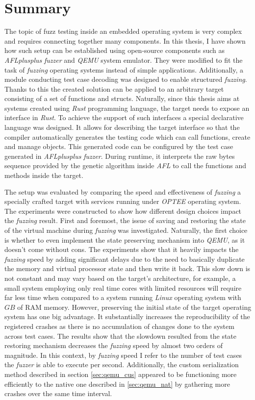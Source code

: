\cleardoublepage
\section{Summary} \label{chap:summ}
The topic of fuzz testing inside an embedded operating system is very complex and requires connecting together many components. In this thesis, I have shown how such setup can be established using open-source components such as \textit{AFLplusplus} \textit{fuzzer} and \textit{QEMU} system emulator. They were modified to fit the task of \textit{fuzzing} operating systems instead of simple applications. Additionally, a module conducting test case decoding was designed to enable structured \textit{fuzzing}. Thanks to this the created solution can be applied to an arbitrary target consisting of a set of functions and structs. Naturally, since this thesis aims at systems created using \textit{Rust} programming language, the target needs to expose an interface in \textit{Rust}. To achieve the support of such interfaces a special declarative language was designed. It allows for describing the target interface so that the compiler automatically generates the testing code which can call functions, create and manage objects. This generated code can be configured by the test case generated in \textit{AFLplusplus} \textit{fuzzer}. During runtime, it interprets the raw bytes sequence provided by the genetic algorithm inside \textit{AFL} to call the functions and methods inside the target.

The setup was evaluated by comparing the speed and effectiveness of \textit{fuzzing} a specially crafted target with services running under \textit{OPTEE} operating system. The experiments were constructed to show how different design choices impact the \textit{fuzzing} result. First and foremost, the issue of saving and restoring the state of the virtual machine during \textit{fuzzing} was investigated. Naturally, the first choice is whether to even implement the state preserving mechanism into \textit{QEMU}, as it doesn't come without cons. The experiments show that it heavily impacts the \textit{fuzzing} speed by adding significant delays due to the need to basically duplicate the memory and virtual processor state and then write it back. This slow down is not constant and may vary based on the target's architecture, for example, a small system employing only real time cores with limited resources will require far less time when compared to a system running \textit{Linux} operating system with $GB$ of RAM memory. However, preserving the initial state of the target operating system has one big advantage. It substantially increases the reproducibility of the registered crashes as there is no accumulation of changes done to the system across test cases. The results show that the slowdown resulted from the state restoring mechanism decreases the \textit{fuzzing} speed by almost two orders of magnitude. In this context, by \textit{fuzzing} speed I refer to the number of test cases the \textit{fuzzer} is able to execute per second. Additionally, the custom serialization method described in section \ref{sec:qemu_cus} appeared to be functioning more efficiently to the native one described in \ref{sec:qemu_nat} by gathering more crashes over the same time interval.

